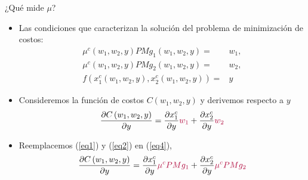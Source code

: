 \documentclass{beamer}
\theoremstyle{definition}
\begin{document}
\begin{frame}{¿Qué mide $\mu$?}
\begin{itemize}
\item Las condiciones que caracterizan la soluci\'{o}n del problema de minimizaci\'{o}n de costos:
\begin{align}
\mu ^{c}\left( w_{1},w_{2},y\right) PMg_{1}\left( w_{1},w_{2},y\right)
=&w_{1},\label{eq1} \\
\mu ^{c}\left( w_{1},w_{2},y\right) PMg_{2}\left( w_{1},w_{2},y\right)
=&w_{2}, \label{eq2}\\
f\left( x_{1}^{c}\left( w_{1},w_{2},y\right) ,x_{2}^{c}\left(
w_{1},w_{2},y\right) \right) =&y \label{eq3}
\end{align}

\item Consideremos la función de costos $C(w_1,w_2,y)$ y derivemos respecto a $y$
\begin{equation}
\frac{\partial C\left( w_{1},w_{2},y\right) }{\partial y}=\frac{\partial
x_{1}^{c}}{\partial y}\color{rosee}w_{1}\color{black}+\frac{\partial x_{2}^{c}}{\partial y}\color{rosee}w_{2}\color{black} \label{eq4}
\end{equation}
\item Reemplacemos (\ref{eq1}) y (\ref{eq2}) en (\ref{eq4}),
\begin{equation}
\frac{\partial C\left( w_{1},w_{2},y\right) }{\partial y}=\frac{\partial x_{1}^{c}}{\partial y}\color{rosee}\mu ^{c}PMg_{1}\color{black}+\frac{\partial x_{2}^{c}}{\partial y}\color{rosee}\mu ^{c}PMg_{2}\color{black} \label{eq5}
\end{equation}
\end{itemize}
\end{frame}
\end{document}
